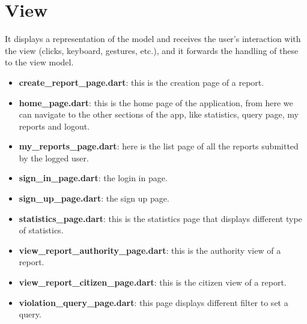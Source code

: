 \documentclass[../ITD.tex]{subfiles}
\begin{document}
    \section{View}\label{sec:view}
    It displays a representation of the model and receives the user's interaction with the view (clicks, keyboard, gestures, etc.), and it forwards the handling of these to the view model.
    \begin{itemize}
        \item \textbf{create\_report\_page.dart}: this is the creation page of a report.
        \item \textbf{home\_page.dart}: this is the home page of the application, from here we can navigate to the other sections of the app, like statistics, query page, my reports and logout.
        \item \textbf{my\_reports\_page.dart}: here is the list page of all the reports submitted by the logged user.
        \item \textbf{sign\_in\_page.dart}: the login in page.
        \item \textbf{sign\_up\_page.dart}: the sign up page.
        \item \textbf{statistics\_page.dart}: this is the statistics page that displays different type of statistics.
        \item \textbf{view\_report\_authority\_page.dart}: this is the authority view of a report.
        \item \textbf{view\_report\_citizen\_page.dart}: this is the citizen view of a report.
        \item \textbf{violation\_query\_page.dart}: this page displays different filter to set a query.
    \end{itemize}
\end{document}
